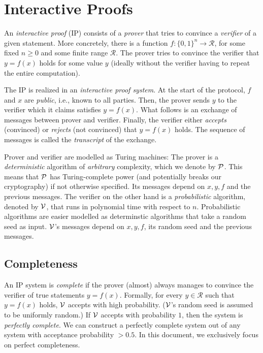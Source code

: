 \section{Interactive Proofs}

An \emph{interactive proof} (IP) consists of a \emph{prover} that tries to convince a \emph{verifier} of a given statement.
More concretely,
there is a function $f: \{ 0, 1 \}^n \to \mathcal{R}$,
for some fixed $n \geq 0$ and some finite range $\mathcal{R}$.
The prover tries to convince the verifier that $y = f(x)$ holds for some value $y$
(ideally without the verifier having to repeat the entire computation).

The IP is realized in an \emph{interactive proof system}.
At the start of the protocol,
$f$ and $x$ are \emph{public}, i.e., known to all parties.
Then,
the prover sends $y$ to the verifier which it claims satisfies $y = f(x)$.
What follows is an exchange of messages between prover and verifier.
Finally,
the verifier either \emph{accepts} (convinced) or \emph{rejects} (not convinced) that $y = f(x)$ holds.
The sequence of messages is called the \emph{transcript} of the exchange.

Prover and verifier are modelled as Turing machines:
The prover is a \emph{deterministic} algorithm of \emph{arbitrary} complexity,
which we denote by $\mathcal{P}$.
This means that $\mathcal{P}$ has Turing-complete power (and potentially breaks our cryptography) if not otherwise specified.
Its messages depend on $x, y, f$ and the previous messages.
%
The verifier on the other hand is a \emph{probabilistic} algorithm,
denoted by $\mathcal{V}$,
that runs in polynomial time with respect to $n$.
Probabilistic algorithms are easier modelled as determinstic algorithms that take a random seed as input.
$\mathcal{V}$'s messages depend on $x, y, f$, its random seed and the previous messages.

\subsection{Completeness}

An IP system is \emph{complete} if the prover (almost) always manages to convince the verifier of true statements $y = f(x)$.
%
Formally,
for every $y \in \mathcal{R}$ such that $y = f(x)$ holds,
$\mathcal{V}$ accepts with high probability.
($\mathcal{V}$'s random seed is assumed to be uniformly random.)
%
If $\mathcal{V}$ accepts with probability $1$,
then the system is \emph{perfectly complete}.
We can construct a perfectly complete system out of any system with acceptance probability $> 0.5$.
%
In this document,
we exclusively focus on perfect completeness.

